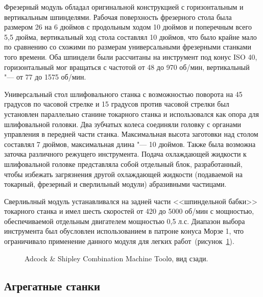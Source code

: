 Фрезерный модуль обладал оригинальной конструкцией с горизонтальным и вертикальным шпинделями. Рабочая поверхность фрезерного стола была размером 26 на 6 дюймов с продольным ходом 10 дюймов и поперечным всего 5,5 дюйма, вертикальный ход стола составлял 10 дюймов, что было крайне мало по сравнению со схожими по размерам универсальными фрезерными станками того времени. Оба шпиндели были рассчитаны на инструмент под конус ISO 40, горизонтальный мог вращаться с частотой от 48 до 970 об/мин, вертикальный "--- от 77 до 1575 об/мин.

Универсальный стол шлифовального станка с возможностью поворота на 45 градусов по часовой стрелке и 15 градусов против часовой стрелки был установлен параллельно станине токарного станка и использовался как опора для шлифовальной головки. Два зубчатых колеса соединяли головку с органами управления в передней части станка. Максимальная высота заготовки над столом составлял 7 дюймов, максимальная длина "--- 10 дюймов. Также была возможна заточка различного режущего инструмента. Подача охлаждающей жидкости к шлифовальной головке представляла собой отдельный блок, разработанный, чтобы избежать загрязнения другой охлаждающей жидкости (подаваемой на токарный, фрезерный и сверлильный модули) абразивными частицами.

Сверлиьлный модуль устанавливался на задней части <<шпиндельной бабки>> токарного станка и имел шесть скоростей от 420 до 5000 об/мин с мощностью, обеспечиваемой отдельным двигателем мощностью 0,5 л.с. Диапазон выбора инструмента был обусловлен использованием в патроне конуса Морзе 1, что ограничивало применение данного модуля для легких работ~(рисунок~\cref{fig:adcock-2}).

\begin{figure}[ht]
	\caption{Adcock \& Shipley Combination Machine Toolо, вид сзади.}\label{fig:adcock-2}
\end{figure}

\subsection{Агрегатные станки}

